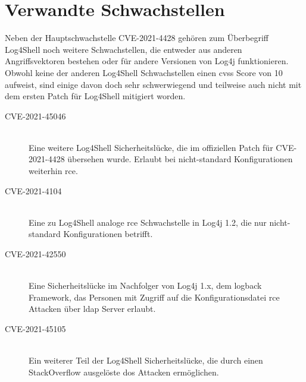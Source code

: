 
\section{Verwandte Schwachstellen}\label{sec:similarCVEs}
Neben der Hauptschwachstelle CVE-2021-4428 gehören zum Überbegriff Log4Shell noch weitere Schwachstellen, die entweder aus anderen Angriffsvektoren bestehen oder für andere Versionen von Log4j funktionieren.
Obwohl keine der anderen Log4Shell Schwachstellen einen \gls{cvss} Score von 10 aufweist, sind einige davon doch sehr schwerwiegend und teilweise auch nicht mit dem ersten Patch für Log4Shell mitigiert worden.

\begin{description}
    \item[CVE-2021-45046]\label{itm:cve-2021-45046}\hfill \\
    Eine weitere Log4Shell Sicherheitslücke, die im offiziellen Patch für CVE-2021-4428 übersehen wurde.
    Erlaubt bei nicht-standard Konfigurationen weiterhin \gls{rce}.

    \item[CVE-2021-4104]\hfill \\
    Eine zu Log4Shell analoge \gls{rce} Schwachstelle in Log4j 1.2, die nur nicht-standard Konfigurationen betrifft.

    \item[CVE-2021-42550]\hfill \\
    Eine Sicherheitslücke im Nachfolger von Log4j 1.x, dem logback Framework, das Personen mit Zugriff auf die Konfigurationsdatei \gls{rce} Attacken über \gls{ldap} Server erlaubt.

    \item[CVE-2021-45105]\hfill \\
    Ein weiterer Teil der Log4Shell Sicherheitslücke, die durch einen StackOverflow ausgelöste \gls{dos} Attacken ermöglichen.
\end{description}
